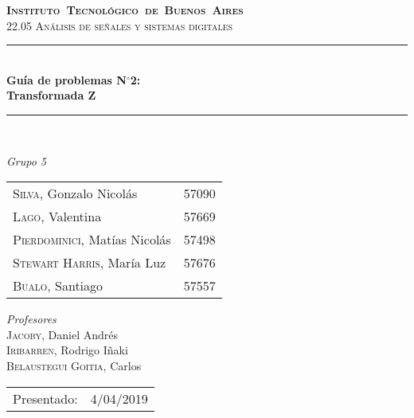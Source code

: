 \begin{titlepage}
\newcommand{\HRule}{\rule{\linewidth}{0.5mm}}
\center
\mbox{\textsc{\LARGE \bfseries {Instituto Tecnol\'ogico de Buenos Aires}}}\\[1.5cm]
\textsc{\Large 22.05 An\'alisis de señales y sistemas digitales}\\[0.5cm]


\HRule \\[0.6cm]
{ \Huge \bfseries Gu\'ia de problemas N$^\circ$2: \\ Transformada Z}\\[0.4cm] %
\HRule \\[1.5cm]


{\large

\emph{Grupo 5}\\
\vspace{3px}

\begin{tabular}{lr} 	
\textsc{Silva}, Gonzalo Nicol\'as & 57090 \\
\textsc{Lago}, Valentina & 57669 \\ 	
\textsc{Pierdominici}, Mat\'ias Nicol\'as & 57498 \\
\textsc{Stewart Harris}, Mar\'ia Luz  & 57676 \\ 
\textsc{Bualo}, Santiago  & 57557 \\	     
\end{tabular}

\vspace{20px}

\emph{Profesores}\\
\vspace{3px}
\textsc{Jacoby,} Daniel Andr\'es\\ 	
\textsc{Iribarren,} Rodrigo I\~naki\\
\textsc{Belaustegui Goitia,} Carlos \\

\vspace{100px}

\begin{tabular}{ll}

Presentado: & 4/04/2019\\

\end{tabular}

}

\vfill

\end{titlepage}